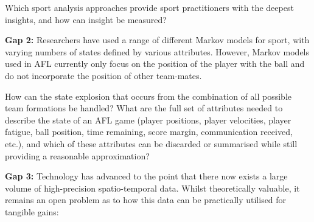 Which sport analysis approaches provide sport practitioners with the deepest insights, and how can insight be measured?



\textbf{Gap 2:} Researchers have used a range of different
Markov models for sport, with varying numbers of states
defined by various attributes. However, Markov models used in AFL currently only focus on the position of the player with the ball and do not incorporate the position of other team-mates.

How can the state explosion that occurs from the combination of all possible team formations be handled? What are the full set of attributes needed to describe the state of an AFL game (player positions, player velocities, player fatigue, ball
position, time remaining, score margin, communication received, etc.), and which of these attributes can be discarded or summarised while still providing a
reasonable approximation?


\textbf{Gap 3:} Technology has advanced to the point that there
now exists a large volume of high-precision spatio-temporal data. Whilst
theoretically valuable, it remains an open problem as to how this data can
be practically utilised for tangible gains:


